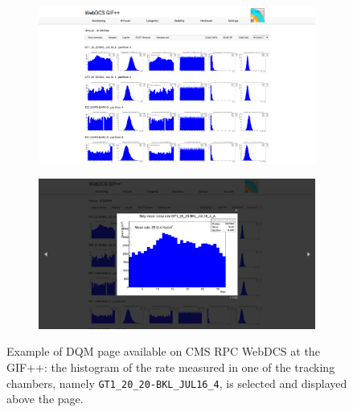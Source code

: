 	\begin{figure}[H]
    	\begin{subfigure}{\linewidth}
			\centering
    		\includegraphics[width = .9\linewidth]{fig/chapt5/GIFpp-DQM-DAQ-fullpage.png}
        	\caption{\label{fig:DQM-DAQ:A}}
    	\end{subfigure}
    	\begin{subfigure}{\linewidth}
			\centering
    		\includegraphics[width = .9\linewidth]{fig/chapt5/GIFpp-DQM-DAQ.png}
        	\caption{\label{fig:DQM-DAQ:B}}
    	\end{subfigure}
		\caption{\label{fig:DQM-DAQ} Example of DQM page available on CMS RPC WebDCS at the GIF++: the histogram of the rate measured in one of the tracking chambers, namely \texttt{GT1\_20\_20-BKL\_JUL16\_4}, is selected and displayed above the page.}
	\end{figure}
		
